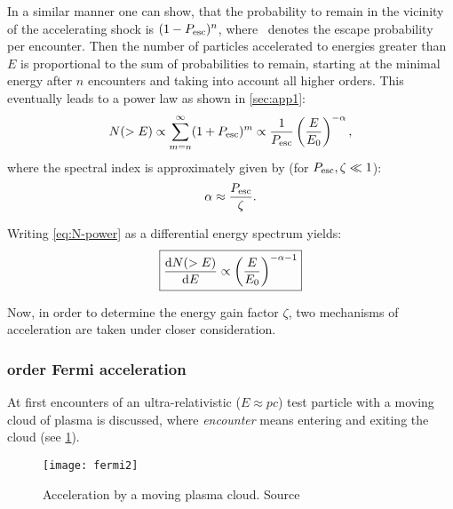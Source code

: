 In a similar manner one can show, that the probability to remain in the
vicinity of the accelerating shock is $(1-P_{\mathrm{esc}})^n$, where \Pesc~denotes the
escape probability per encounter.
Then the number of particles accelerated to energies greater than $E$ is
proportional to the sum of probabilities to remain, starting at the minimal
energy after $n$ encounters and taking into account all higher orders. This
eventually leads to a power law as shown in \cref{sec:app1}:
\begin{equation}
    N(>E)\propto\sum_{m=n}^{\infty}(1+P_{\mathrm{esc}})^m
    \propto\frac{1}{P_{\mathrm{esc}}}\left(\frac{E}{E_0}\right)^{-\alpha},
    \label{eq:N-power}
\end{equation}
where the spectral index is approximately given by (for $P_{\mathrm{esc}},\zeta\ll1$):
\begin{equation}
    \alpha\approx\frac{P_{\mathrm{esc}}}{\zeta}.
    \label{eq:alpha}
\end{equation}

Writing \cref{eq:N-power} as a differential energy spectrum yields:
\begin{equation}
    \boxed{%
        \dv{N(>E)}{E}\propto\left(\frac{E}{E_0}\right)^{-\alpha-1}
    }
    \label{eq:N-diff}
\end{equation}

Now, in order to determine the energy gain factor $\zeta$, two mechanisms of
acceleration are taken under closer consideration.


\subsubsection{ order Fermi acceleration}
At first encounters of an ultra-relativistic ($E\approx pc$) test particle with
a moving cloud of plasma is discussed, where \emph{encounter} means entering
and exiting the cloud (see \cref{fig:fermi2}).

\begin{figure}[ht]
    \centering
    \texttt{[image: fermi2]}
    \caption{Acceleration by a moving plasma cloud. Source\autocite{Gaisser}}
    \label{fig:fermi2}
\end{figure}

